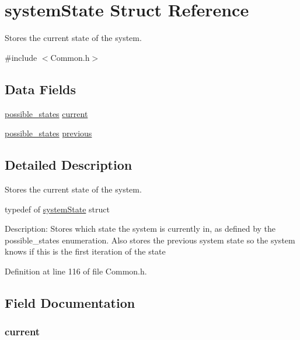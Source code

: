 \hypertarget{structsystem_state}{\section{system\+State Struct Reference}
\label{structsystem_state}
}


Stores the current state of the system.  




{\ttfamily \#include $<$Common.\+h$>$}

\subsection*{Data Fields}
\begin{DoxyCompactItemize}
\item 
\hyperlink{_common_8h_a05931287b056487cf89495f39026fbe1}{possible\+\_\+states} \hyperlink{structsystem_state_a18284a4a782e71c070e1d2e80734509d}{current}
\item 
\hyperlink{_common_8h_a05931287b056487cf89495f39026fbe1}{possible\+\_\+states} \hyperlink{structsystem_state_af2f2716b4afa23c8b53a9351a0924b6b}{previous}
\end{DoxyCompactItemize}


\subsection{Detailed Description}
Stores the current state of the system. 



 typedef of \hyperlink{structsystem_state}{system\+State} struct

Description\+: Stores which state the system is currently in, as defined by the possible\+\_\+states enumeration. Also stores the previous system state so the system knows if this is the first iteration of the state 

Definition at line 116 of file Common.\+h.



\subsection{Field Documentation}
\hypertarget{structsystem_state_a18284a4a782e71c070e1d2e80734509d}{
\subsubsection[{current}]{ current}}\label{structsystem_state_a18284a4a782e71c070e1d2e80734509d}


